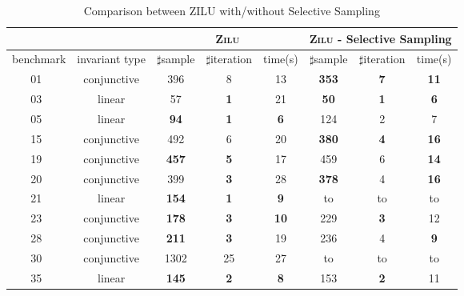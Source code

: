 \begin{table}[t]
\centering
\caption{Comparison between ZILU with/without Selective Sampling}
\begin{tabular}{l c | c c c | c c c |}
\cline{3-8}
& &\multicolumn{3}{|c|}{\textsc{Zilu}}&\multicolumn{3}{c|}{\textsc{Zilu} - Selective Sampling}\\
\hline
\multicolumn{1}{|c|}{benchmark}&\multicolumn{1}{|c|}{invariant type}& $\sharp$sample & $\sharp$iteration & time(s) & $\sharp$sample & $\sharp$iteration &time(s) \\
\hline
\multicolumn{1}{|c|}{01~\cite{isil2013inductive}}				&conjunctive	&396	&8	&13	&\textbf{353}	&\textbf{7}	&\textbf{11}\\
\multicolumn{1}{|c|}{03~\cite{isil2013inductive}}				&linear			&57	&\textbf{1}	&21	&\textbf{50}	&\textbf{1}	&\textbf{6}\\
\multicolumn{1}{|c|}{05~\cite{isil2013inductive}}				&linear 		&\textbf{94}	&\textbf{1}	&\textbf{6}	&124	&2	&7\\
\multicolumn{1}{|c|}{15~\cite{isil2013inductive}}				&conjunctive	&492	&6	&20	&\textbf{380}	&\textbf{4}	&\textbf{16}\\
\multicolumn{1}{|c|}{19~\cite{isil2013inductive}}				&conjunctive	&\textbf{457}	&\textbf{5}	&17	&459	&6	&\textbf{14}\\
\multicolumn{1}{|c|}{20~\cite{isil2013inductive}}				&conjunctive	&399	&\textbf{3}	&28	&\textbf{378}	&4	&\textbf{16}\\
\multicolumn{1}{|c|}{21~\cite{isil2013inductive}}				&linear			&\textbf{154}	&\textbf{1}	&\textbf{9}	       &to	&to	&to								\\
\multicolumn{1}{|c|}{23~\cite{isil2013inductive}}				&conjunctive	&\textbf{178}	&\textbf{3}	&\textbf{10}       &229	&\textbf{3}	&12						\\
\multicolumn{1}{|c|}{28~\cite{isil2013inductive}}				&conjunctive	&\textbf{211}	&\textbf{3}	&19			       &236	&4	&\textbf{9}						\\
\multicolumn{1}{|c|}{30~\cite{isil2013inductive}}				&conjunctive	&1302	&25	&27&to	&to	&to\\
\multicolumn{1}{|c|}{35~\cite{isil2013inductive}}				&linear			&\textbf{145}	&\textbf{2}	&\textbf{8}	       &153	&\textbf{2}	&11						\\

\end{tabular}
\end{table}
